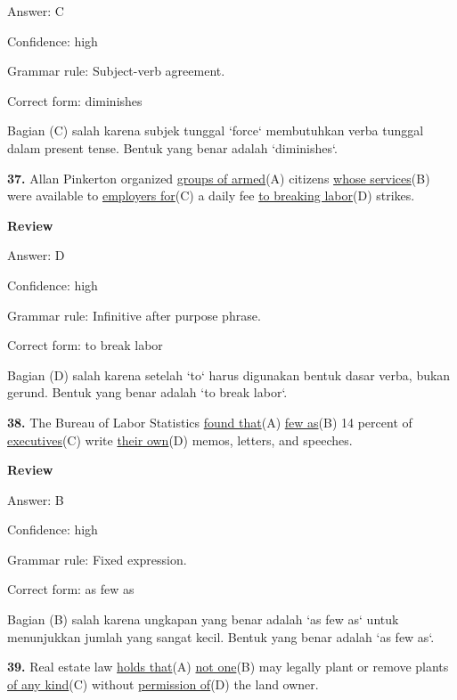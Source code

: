 \documentclass[12pt]{article}
\begin{document}
Answer: C\par
Confidence: high\par
Grammar rule: Subject-verb agreement.\par
Correct form: diminishes\par
Bagian (C) salah karena subjek tunggal `force` membutuhkan verba tunggal dalam present tense. Bentuk yang benar adalah `diminishes`.\par
\endgroup
\par
\vspace{\questionblockgap}
\noindent\textbf{37.} Allan Pinkerton organized \uline{groups of armed}(A) citizens \uline{whose services}(B) were available to \uline{employers for}(C) a daily fee \uline{to breaking labor}(D) strikes.
\par
\begingroup
\setlength{\parskip}{0pt}
\setlength{\parindent}{0pt}
\textbf{Review}\par
Answer: D\par
Confidence: high\par
Grammar rule: Infinitive after purpose phrase.\par
Correct form: to break labor\par
Bagian (D) salah karena setelah `to` harus digunakan bentuk dasar verba, bukan gerund. Bentuk yang benar adalah `to break labor`.\par
\endgroup
\par
\vspace{\questionblockgap}
\noindent\textbf{38.} The Bureau of Labor Statistics \uline{found that}(A) \uline{few as}(B) 14 percent of \uline{executives}(C) write \uline{their own}(D) memos, letters, and speeches.
\par
\begingroup
\setlength{\parskip}{0pt}
\setlength{\parindent}{0pt}
\textbf{Review}\par
Answer: B\par
Confidence: high\par
Grammar rule: Fixed expression.\par
Correct form: as few as\par
Bagian (B) salah karena ungkapan yang benar adalah `as few as` untuk menunjukkan jumlah yang sangat kecil. Bentuk yang benar adalah `as few as`.\par
\endgroup
\par
\vspace{\questionblockgap}
\noindent\textbf{39.} Real estate law \uline{holds that}(A) \uline{not one}(B) may legally plant or remove plants \uline{of any kind}(C) without \uline{permission of}(D) the land owner.
\end{document}
